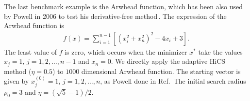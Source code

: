 \documentclass[final,1p,times]{elsarticle}
\begin{document}
%
The last benchmark example is the Arwhead function, which has been
also used by Powell in 2006 to test his derivative-free
method\,\cite{powell2006newuoa}. The expression of the Arwhead function is
\begin{align}
	f(x) = \sum_{i=1}^{n-1}[(x_i^2+x_n^2)^2 - 4 x_i +3].
	\label{}
\end{align}
The least value of $f$ is zero, which occurs when the minimizer
$x^*$ take the values $x_j=1$, $j=1,2,\dots,n-1$ and $x_n=0$. 
We directly apply the adaptive HiCS method ($\eta=0.5$) to $1000$
dimensional Arwhead function.
The starting vector is given by $x_j^{(0)}=1$, $j=1,2,\dots,n$, as
Powell done in Ref.\,\cite{powell2006newuoa}
The initial search radius $\rho_0=3$ and $\eta=(\sqrt{5}-1)/2$.
\end{document}
